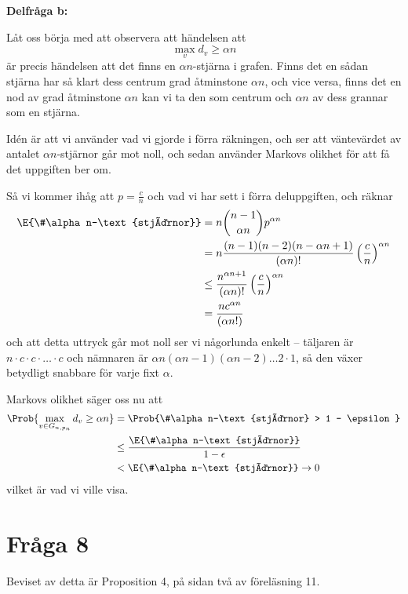 \documentclass[nobib]{tufte-handout}
\begin{document}
\noindent\textbf{Delfråga b:}

Låt oss börja med att observera att händelsen att
$$\max_v d_v \geq \alpha n$$
är precis händelsen att det finns en $\alpha n$-stjärna i grafen. Finns det en sådan stjärna har så klart dess centrum grad åtminstone $\alpha n$, och vice versa, finns det en nod av grad åtminstone $\alpha n$ kan vi ta den som centrum och $\alpha n$ av dess grannar som en stjärna.

Idén är att vi använder vad vi gjorde i förra räkningen, och ser att väntevärdet av antalet $\alpha n$-stjärnor går mot noll, och sedan använder Markovs olikhet för att få det uppgiften ber om.

Så vi kommer ihåg att $p = \frac{c}{n}$ och vad vi har sett i förra deluppgiften, och räknar
\begin{align*}
  \E{\#\alpha n-\text{stjärnor}} &= n \binom{n-1}{\alpha n}p^{\alpha n}\\
  &= n \frac{(n-1)(n-2)(n - \alpha n + 1)}{(\alpha n)!} \left(\frac{c}{n}\right)^{\alpha n}\\
  &\leq \frac{n^{\alpha n + 1}}{(\alpha n)!}\left(\frac{c}{n}\right)^{\alpha n}\\
  &= \frac{n c^{\alpha n}}{(\alpha n!)}
\end{align*}
och att detta uttryck går mot noll ser vi någorlunda enkelt -- täljaren är $n\cdot c \cdot c\cdot\ldots\cdot c$ och nämnaren är $\alpha n(\alpha n - 1)(\alpha n - 2)\ldots2\cdot1$, så den växer betydligt snabbare för varje fixt $\alpha$.

Markovs olikhet säger oss nu att
\begin{align*}
  \Prob{\max_{v \in G_{n,p_n}} d_v \geq \alpha n} &= \Prob{\#\alpha n-\text{stjärnor} > 1 - \epsilon}\\
  &\leq \frac{\E{\#\alpha n-\text{stjärnor}}}{1 - \epsilon}\\
  &< \E{\#\alpha n-\text{stjärnor}} \to 0
\end{align*}
vilket är vad vi ville visa.

\section{Fråga 8}

Beviset av detta är Proposition 4, på sidan två av föreläsning 11.

%
%
\end{document}
